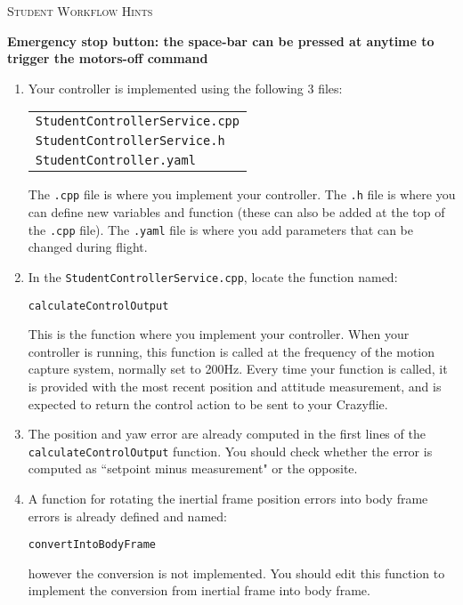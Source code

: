 \documentclass[]{report}
\newcommand{\cppfile}{StudentControllerService.cpp}
\newcommand{\headerfile}{StudentControllerService.h}
\newcommand{\yamlfile}{StudentController.yaml}
\newcommand{\computecontroloutputfunction}{calculateControlOutput}
\newcommand{\convertintobodyframefunction}{convertIntoBodyFrame}
\begin{document}
	
	\begin{center}
		\huge{\textsc{Student Workflow Hints}}
	\end{center}
	
	\begin{center}
		\textbf{Emergency stop button: the space-bar can be pressed at anytime to trigger the motors-off command}
	\end{center}


	\begin{enumerate}[topsep=-1pt , itemsep=1pt ,  label = \textbf{(\arabic{*})} ]
		\item Your controller is implemented using the following 3 files:
		
			\begin{center}
				\begin{tabular}{l}
					\large{\texttt{\cppfile}}
					\\
					\large{\texttt{\headerfile}}
					\\
					\large{\texttt{\yamlfile}}
				\end{tabular}
			\end{center}
		
		The \texttt{.cpp} file is where you implement your controller. The \texttt{.h} file is where you can define new variables and function (these can also be added at the top of the \texttt{.cpp} file). The \texttt{.yaml} file is where you add parameters that can be changed during flight.
		
		\item In the \texttt{\cppfile}, locate the function named:
		\begin{center}
			\texttt{\computecontroloutputfunction}
		\end{center}
		This is the function where you implement your controller. When your controller is running, this function is called at the frequency of the motion capture system, normally set to 200Hz. Every time your function is called, it is provided with the most recent position and attitude measurement, and is expected to return the control action to be sent to your Crazyflie.
		
		\item The position and yaw error are already computed in the first lines of the \texttt{\computecontroloutputfunction} function. You should check whether the error is computed as ``setpoint minus measurement" or the opposite.
		
		\item A function for rotating the inertial frame position errors into body frame errors is already defined and named:
		\begin{center}
			\texttt{\convertintobodyframefunction}
		\end{center}
		however the conversion is not implemented. You should edit this function to implement the conversion from inertial frame into body frame.
		

\end{enumerate}
\end{document}

